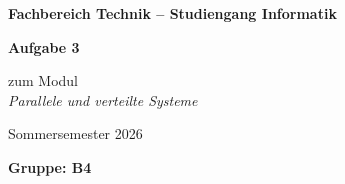 \documentclass{article}
\begin{document}
\begin{titlepage}
    \centering

   

    \textbf{Fachbereich Technik – Studiengang Informatik}
    \vspace{2.5cm}

    {\Huge\bfseries Aufgabe 3 \par}
    \vspace{1cm}
    {\Large zum Modul\\[0.3cm]
    \textit{Parallele und verteilte Systeme}\par}
    \vspace{1cm}
    {\large Sommersemester 2026\par}

    \vfill

    \begin{flushleft}
    \textbf{Gruppe: B4}
    \end{flushleft}
\end{titlepage}




\tableofcontents

\newpage
\end{document}
